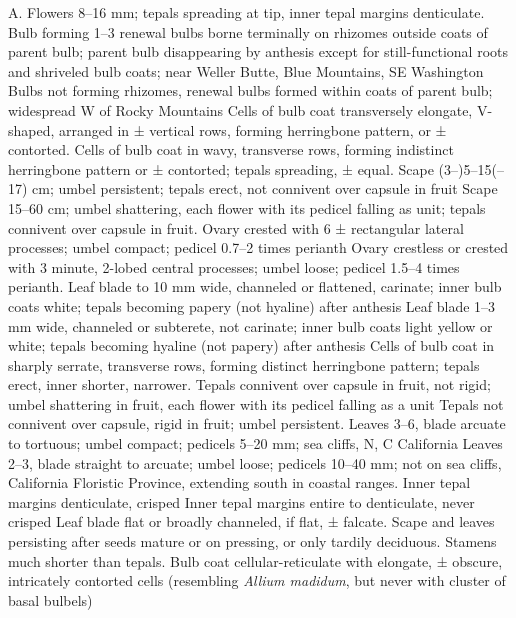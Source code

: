 \documentclass[a4paper]{article}
\begin{document}
\begin{Key}{A. }
\alter Flowers 8--16 mm; tepals spreading at tip, inner tepal margins denticulate.
\alter Bulb forming 1--3 renewal bulbs borne terminally on rhizomes outside coats of parent bulb; parent bulb disappearing by anthesis except for still-functional roots and shriveled bulb coats; near Weller Butte, Blue Mountains, SE Washington
\alter Bulbs not forming rhizomes, renewal bulbs formed within coats of parent bulb; widespread W of Rocky Mountains
\alter Cells of bulb coat transversely elongate, V-shaped, arranged in ± vertical rows, forming herringbone pattern, or ± contorted.
\alter Cells of bulb coat in wavy, transverse rows, forming indistinct herringbone pattern or ± contorted; tepals spreading, ± equal.
\alter Scape (3--)5--15(--17) cm; umbel persistent; tepals erect, not connivent over capsule in fruit
\alter Scape 15--60 cm; umbel shattering, each flower with its pedicel falling as unit; tepals connivent over capsule in fruit.
\alter Ovary crested with 6 ± rectangular lateral processes; umbel compact; pedicel 0.7--2 times perianth
\alter Ovary crestless or crested with 3 minute, 2-lobed central processes; umbel loose; pedicel 1.5--4 times perianth.
\alter Leaf blade to 10 mm wide, channeled or flattened, carinate; inner bulb coats white; tepals becoming papery (not hyaline) after anthesis
\alter Leaf blade 1--3 mm wide, channeled or subterete, not carinate; inner bulb coats light yellow or white; tepals becoming hyaline (not papery) after anthesis
\alter Cells of bulb coat in sharply serrate, transverse rows, forming distinct herringbone pattern; tepals erect, inner shorter, narrower.
\alter Tepals connivent over capsule in fruit, not rigid; umbel shattering in fruit, each flower with its pedicel falling as a unit
\alter Tepals not connivent over capsule, rigid in fruit; umbel persistent.
\alter Leaves 3--6, blade arcuate to tortuous; umbel compact; pedicels 5--20 mm; sea cliffs, N, C California
\alter Leaves 2--3, blade straight to arcuate; umbel loose; pedicels 10--40 mm; not on sea cliffs, California Floristic Province, extending south in coastal ranges.
\alter Inner tepal margins denticulate, crisped
\alter Inner tepal margins entire to denticulate, never crisped
\alter Leaf blade flat or broadly channeled, if flat, ± falcate.
\alter Scape and leaves persisting after seeds mature or on pressing, or only tardily deciduous.
\alter Stamens much shorter than tepals.
\alter Bulb coat cellular-reticulate with elongate, ± obscure, intricately contorted cells (resembling \textit{Allium madidum}, but never with cluster of basal bulbels)

\end{Key}
\end{document}
